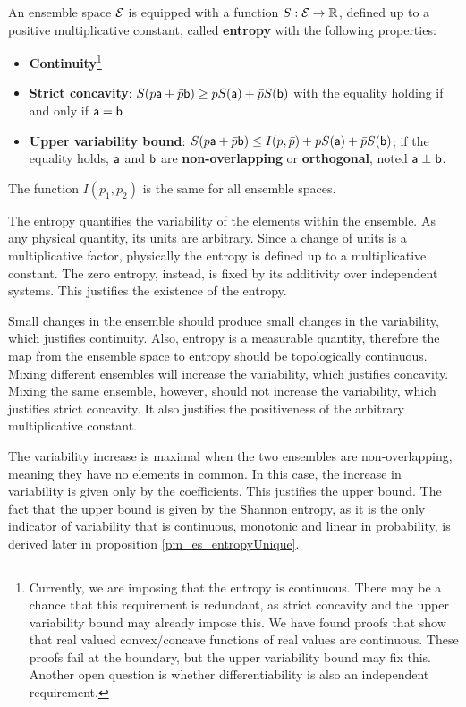 \begin{axiom}
	An ensemble space $\Ens$ is equipped with a function $S : \Ens \to \mathbb{R}$, defined up to a positive multiplicative constant, called \textbf{entropy} with the following properties:
	\begin{itemize}
		\item \textbf{Continuity}\footnote{Currently, we are imposing that the entropy is continuous. There may be a chance that this requirement is redundant, as strict concavity and the upper variability bound may already impose this. We have found proofs that show that real valued convex/concave functions of real values are continuous. These proofs fail at the boundary, but the upper variability bound may fix this. Another open question is whether differentiability is also an independent requirement.}
		\item \textbf{Strict concavity}: $S(p\ens[a] + \bar{p} \ens[b]) \geq p S(\ens[a]) + \bar{p} S(\ens[b])$ with the equality holding if and only if $\ens[a] = \ens[b]$
		\item \textbf{Upper variability bound}: $S(p\ens[a] + \bar{p} \ens[b]) \leq I(p, \bar{p}) + p S(\ens[a]) + \bar{p} S(\ens[b])$; if the equality holds, $\ens[a]$ and $\ens[b]$ are \textbf{non-overlapping} or \textbf{orthogonal}, noted $\ens[a] \ortho \ens[b]$.
	\end{itemize}
	The function $I(p_1, p_2)$ is the same for all ensemble spaces.
\end{axiom}

\begin{justification}
	The entropy quantifies the variability of the elements within the ensemble. As any physical quantity, its units are arbitrary. Since a change of units is a multiplicative factor, physically the entropy is defined up to a multiplicative constant. The zero entropy, instead, is fixed by its additivity over independent systems. This justifies the existence of the entropy.
	
	Small changes in the ensemble should produce small changes in the variability, which justifies continuity. Also, entropy is a measurable quantity, therefore the map from the ensemble space to entropy should be topologically continuous. Mixing different ensembles will increase the variability, which justifies concavity. Mixing the same ensemble, however, should not increase the variability, which justifies strict concavity. It also justifies the positiveness of the arbitrary multiplicative constant.
	
	The variability increase is maximal when the two ensembles are non-overlapping, meaning they have no elements in common. In this case, the increase in variability is given only by the coefficients. This justifies the upper bound. The fact that the upper bound is given by the Shannon entropy, as it is the only indicator of variability that is continuous, monotonic and linear in probability, is derived later in proposition \ref{pm_es_entropyUnique}.
\end{justification}

